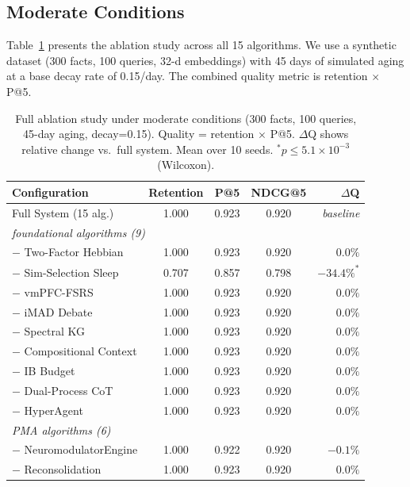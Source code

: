 \documentclass{article}
\begin{document}
\subsection{Moderate Conditions}

Table~\ref{tab:full-ablation} presents the ablation study across all 15
algorithms.  We use a synthetic dataset (300 facts, 100 queries, 32-d embeddings)
with 45 days of simulated aging at a base decay rate of 0.15/day.
The combined quality metric is retention $\times$ P@5.

\begin{table}[h]
    \caption{Full ablation study under moderate conditions (300 facts, 100 queries,
    45-day aging, decay=0.15). Quality = retention $\times$ P@5.
    $\Delta$Q shows relative change vs.\ full system.
    Mean over 10 seeds. $^\ast p \le 5.1\times 10^{-3}$ (Wilcoxon).}
    \label{tab:full-ablation}
    \centering
    \small
    \begin{tabular}{lcccr}
        \toprule
        Configuration & Retention & P@5 & NDCG@5 & $\Delta$Q \\
        \midrule
        Full System (15 alg.) & 1.000 & 0.923 & 0.920 & \emph{baseline} \\
        \midrule
        \multicolumn{5}{l}{\textit{foundational algorithms (9)}} \\
        $-$ Two-Factor Hebbian & 1.000 & 0.923 & 0.920 & $0.0\%$ \\
        $-$ Sim-Selection Sleep & 0.707 & 0.857 & 0.798 & $-34.4\%^\ast$ \\
        $-$ vmPFC-FSRS & 1.000 & 0.923 & 0.920 & $0.0\%$ \\
        $-$ iMAD Debate & 1.000 & 0.923 & 0.920 & $0.0\%$ \\
        $-$ Spectral KG & 1.000 & 0.923 & 0.920 & $0.0\%$ \\
        $-$ Compositional Context & 1.000 & 0.923 & 0.920 & $0.0\%$ \\
        $-$ IB Budget & 1.000 & 0.923 & 0.920 & $0.0\%$ \\
        $-$ Dual-Process CoT & 1.000 & 0.923 & 0.920 & $0.0\%$ \\
        $-$ HyperAgent & 1.000 & 0.923 & 0.920 & $0.0\%$ \\
        \midrule
        \multicolumn{5}{l}{\textit{PMA algorithms (6)}} \\
        $-$ NeuromodulatorEngine & 1.000 & 0.922 & 0.920 & $-0.1\%$ \\
        $-$ Reconsolidation & 1.000 & 0.923 & 0.920 & $0.0\%$ \\

\end{tabular}
\end{table}
\end{document}
